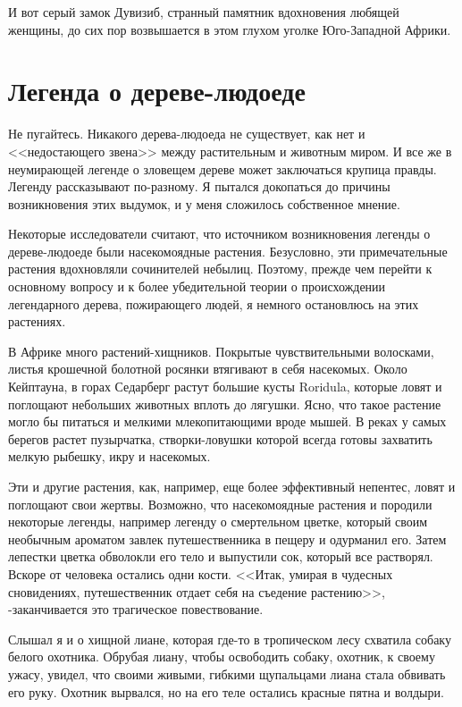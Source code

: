 \documentclass[12pt,a4paper,twoside,openany,svgnames]{memoir}
\begin{document}
И вот серый замок Дувизиб, странный памятник вдохновения любящей женщины, до сих пор возвышается в этом глухом уголке Юго-Западной Африки.

\chapter{Легенда о дереве-людоеде}

Не пугайтесь. Никакого дерева-людоеда не существует, как нет и <<недостающего звена>> между растительным и животным миром. И все же в неумирающей легенде о зловещем дереве может заключаться крупица правды. Легенду рассказывают по-разному. Я пытался докопаться до причины возникновения этих выдумок, и у меня сложилось собственное мнение.

Некоторые исследователи считают, что источником возникновения легенды о дереве-людоеде были насекомоядные растения. Безусловно, эти примечательные растения вдохновляли сочинителей небылиц. Поэтому, прежде чем перейти к основному вопросу и к более убедительной теории о происхождении легендарного дерева, пожирающего людей, я немного остановлюсь на этих растениях.

В Африке много растений-хищников. Покрытые чувствительными волосками, листья крошечной болотной росянки втягивают в себя насекомых. Около Кейптауна, в горах Седарберг растут большие кусты Roridula, которые ловят и поглощают небольших животных вплоть до лягушки. Ясно, что такое растение могло бы питаться и мелкими млекопитающими вроде мышей. В реках у самых берегов растет пузырчатка, створки-ловушки которой всегда готовы захватить мелкую рыбешку, икру и насекомых.

Эти и другие растения, как, например, еще более эффективный непентес, ловят и поглощают свои жертвы. Возможно, что насекомоядные растения и породили некоторые легенды, например легенду о смертельном цветке, который своим необычным ароматом завлек путешественника в пещеру и одурманил его. Затем лепестки цветка обволокли его тело и выпустили сок, который все растворял. Вскоре от человека остались одни кости. <<Итак, умирая в чудесных сновидениях, путешественник отдает себя на съедение растению>>, -заканчивается это трагическое повествование.

Слышал я и о хищной лиане, которая где-то в тропическом лесу схватила собаку белого охотника. Обрубая лиану, чтобы освободить собаку, охотник, к своему ужасу, увидел, что своими живыми, гибкими щупальцами лиана стала обвивать его руку. Охотник вырвался, но на его теле остались красные пятна и волдыри.
\end{document}
